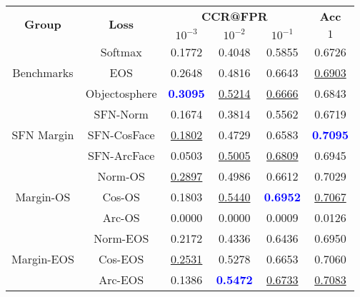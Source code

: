 \begin{tabularx}{.7\textwidth}{|c|c||ccc|c|}
\cline{1-6}
\multirow{2}{*}{\bf Group} & \multirow{2}{*}{\bf Loss} & \multicolumn{3}{c|}{\bf CCR@FPR} & \bf {Acc} \\ \cline{3-6}
& &$10^{-3}$ & $10^{-2}$ & $10^{-1}$ & $1$\\\cline{1-6}\cline{1-6}
\multirow{3}{*}{Benchmarks} & Softmax & 0.1772 & 0.4048 & 0.5855 & 0.6726\\
 & EOS & 0.2648 & 0.4816 & 0.6643 & \underline {0.6903}\\
 & Objectosphere & \textcolor{blue}{\bf 0.3095} & \underline {0.5214} & \underline {0.6666} & 0.6843\\
\cline{1-6}
\multirow{3}{*}{SFN Margin} & SFN-Norm & 0.1674 & 0.3814 & 0.5562 & 0.6719\\
 & SFN-CosFace & \underline {0.1802} & 0.4729 & 0.6583 & \textcolor{blue}{\bf 0.7095}\\
 & SFN-ArcFace & 0.0503 & \underline {0.5005} & \underline {0.6809} & 0.6945\\
\cline{1-6}
\multirow{3}{*}{Margin-OS} & Norm-OS & \underline {0.2897} & 0.4986 & 0.6612 & 0.7029\\
 & Cos-OS & 0.1803 & \underline {0.5440} & \textcolor{blue}{\bf 0.6952} & \underline {0.7067}\\
 & Arc-OS & 0.0000 & 0.0000 & 0.0009 & 0.0126\\
\cline{1-6}
\multirow{3}{*}{Margin-EOS} & Norm-EOS & 0.2172 & 0.4336 & 0.6436 & 0.6950\\
 & Cos-EOS & \underline {0.2531} & 0.5278 & 0.6653 & 0.7060\\
 & Arc-EOS & 0.1386 & \textcolor{blue}{\bf 0.5472} & \underline {0.6733} & \underline {0.7083}\\
\cline{1-6}
\end{tabularx}
